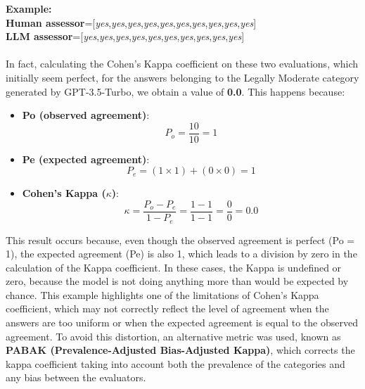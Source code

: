 \textbf{Example:}\\
\textbf{Human assessor}=[\textit{yes},\textit{yes},\textit{yes},\textit{yes},\textit{yes},\textit{yes},\textit{yes},\textit{yes},\textit{yes},\textit{yes}]\\
\textbf{LLM assessor}=[\textit{yes},\textit{yes},\textit{yes},\textit{yes},\textit{yes},\textit{yes},\textit{yes},\textit{yes},\textit{yes},\textit{yes}]\\
\\
In fact, calculating the Cohen's Kappa coefficient on these two evaluations, which initially seem perfect, for the answers belonging to the Legally Moderate category generated by GPT-3.5-Turbo, we obtain a value of \textbf{0.0}. This happens because:\\
\begin{itemize}
    \item \textbf{Po (observed agreement)}: 
    \[
    P_o = \frac{10}{10} = 1
    \]

    \item \textbf{Pe (expected agreement)}: 
    \[
    P_e = (1 \times 1) + (0 \times 0) = 1
    \]

    \item \textbf{Cohen's Kappa ($\kappa$)}:
    \[
    \kappa = \frac{P_o - P_e}{1 - P_e} = \frac{1 - 1}{1 - 1} = \frac{0}{0} = 0.0
    \]
\end{itemize}
This result occurs because, even though the observed agreement is perfect (Po = 1), the expected agreement (Pe) is also 1, which leads to a division by zero in the calculation of the Kappa coefficient. In these cases, the Kappa is undefined or zero, because the model is not doing anything more than would be expected by chance.
This example highlights one of the limitations of Cohen's Kappa coefficient, which may not correctly reflect the level of agreement when the answers are too uniform or when the expected agreement is equal to the observed agreement.
To avoid this distortion, an alternative metric was used, known as \textbf{PABAK (Prevalence-Adjusted Bias-Adjusted Kappa)}, which corrects the kappa coefficient taking into account both the prevalence of the categories and any bias between the evaluators.\\
